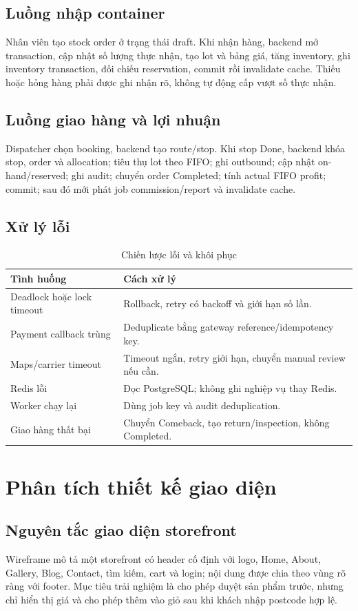 \documentclass[12pt,a4paper]{report}
\begin{document}
\section{Luồng nhập container}
Nhân viên tạo stock order ở trạng thái draft. Khi nhận hàng, backend mở transaction, cập nhật số lượng thực nhận, tạo lot và bảng giá, tăng inventory, ghi inventory transaction, đối chiếu reservation, commit rồi invalidate cache. Thiếu hoặc hỏng hàng phải được ghi nhận rõ, không tự động cấp vượt số thực nhận.

\section{Luồng giao hàng và lợi nhuận}
Dispatcher chọn booking, backend tạo route/stop. Khi stop Done, backend khóa stop, order và allocation; tiêu thụ lot theo FIFO; ghi outbound; cập nhật on-hand/reserved; ghi audit; chuyển order Completed; tính actual FIFO profit; commit; sau đó mới phát job commission/report và invalidate cache.

\section{Xử lý lỗi}
\begin{table}[H]
\centering
\begin{tabularx}{\textwidth}{P{4.0cm}Y}
\toprule
Tình huống & Cách xử lý\\
\midrule
Deadlock hoặc lock timeout & Rollback, retry có backoff và giới hạn số lần.\\
Payment callback trùng & Deduplicate bằng gateway reference/idempotency key.\\
Maps/carrier timeout & Timeout ngắn, retry giới hạn, chuyển manual review nếu cần.\\
Redis lỗi & Đọc PostgreSQL; không ghi nghiệp vụ thay Redis.\\
Worker chạy lại & Dùng job key và audit deduplication.\\
Giao hàng thất bại & Chuyển Comeback, tạo return/inspection, không Completed.\\
\bottomrule
\end{tabularx}
\caption{Chiến lược lỗi và khôi phục}
\end{table}

\chapter{Phân tích thiết kế giao diện}
\section{Nguyên tắc giao diện storefront}
Wireframe mô tả một storefront có header cố định với logo, Home, About, Gallery, Blog, Contact, tìm kiếm, cart và login; nội dung được chia theo vùng rõ ràng với footer. Mục tiêu trải nghiệm là cho phép duyệt sản phẩm trước, nhưng chỉ hiển thị giá và cho phép thêm vào giỏ sau khi khách nhập postcode hợp lệ.
\end{document}
